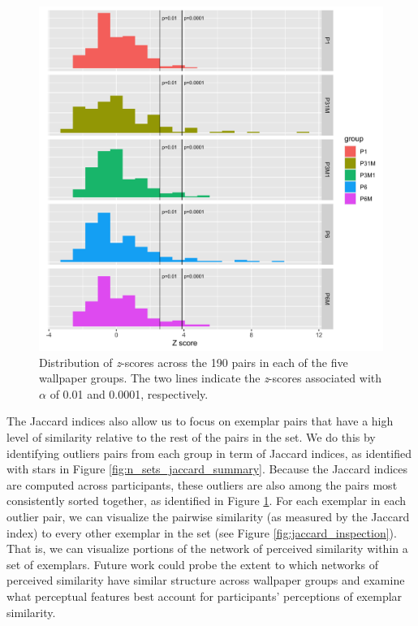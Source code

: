 \documentclass[11pt, twoside]{article}
\begin{document}
\begin{figure}[H]
	\centering
	\includegraphics[width=.85\linewidth]{./figures/jaccard_permutation.png}
	\caption{Distribution of \textit{z}-scores across the 190 pairs in each of the five wallpaper groups. The two lines indicate the \textit{z}-scores associated with $\alpha$ of 0.01 and 0.0001, respectively.}
	\label{fig:jaccard_permutation}
\end{figure}

The Jaccard indices also allow us to focus on exemplar pairs that have a high level of similarity relative to the rest of the pairs in the set. We do this by identifying outliers pairs from each group in term of Jaccard indices, as identified with stars in Figure \ref{fig:n_sets_jaccard_summary}. Because the Jaccard indices are computed across participants, these outliers are also among the pairs most consistently sorted together, as identified in Figure \ref{fig:jaccard_permutation}. For each exemplar in each outlier pair, we can visualize the pairwise similarity (as measured by the Jaccard index) to every other exemplar in the set (see Figure \ref{fig:jaccard_inspection}). That is, we can visualize portions of the network of perceived similarity within a set of exemplars. Future work could probe the extent to which networks of perceived similarity have similar structure across wallpaper groups and examine what perceptual features best account for participants' perceptions of exemplar similarity.
\end{document}

